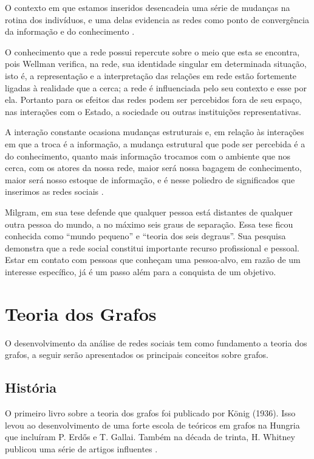 O contexto em que estamos inseridos desencadeia uma série de mudanças na rotina dos indivíduos, e uma delas evidencia as redes como ponto de convergência da informação e do conhecimento \cite{Tomae:Alcara:Chiara:2005}.

O conhecimento que a rede possui repercute sobre o meio que esta se encontra, pois Wellman \cite{Wellman:1996} verifica, na rede, sua identidade singular em determinada situação, isto é, a representação e a interpretação das relações em rede estão fortemente ligadas à realidade que a cerca; a rede é influenciada pelo seu contexto e esse por ela. Portanto para \cite{Marteleto:2001} os efeitos das redes podem ser percebidos fora de seu espaço, nas interações com o Estado, a sociedade ou outras instituições representativas.

A interação constante ocasiona mudanças estruturais e, em relação às interações em que a troca é a informação, a mudança estrutural que pode ser percebida é a do conhecimento, quanto mais informação trocamos com o ambiente que nos cerca, com os atores da nossa rede, maior será nossa bagagem de conhecimento, maior será nosso estoque de informação, e é nesse poliedro de significados que inserimos as redes sociais \cite{Tomae:Alcara:Chiara:2005}.

Milgram, em sua tese \cite{Milgram:1967} defende que qualquer pessoa está distantes de qualquer outra pessoa do mundo, a no máximo seis graus de separação. Essa tese ficou conhecida como ``mundo pequeno'' e ``teoria dos seis degraus''. Sua pesquisa demonstra que a rede social constitui importante recurso profissional e pessoal. Estar em contato com pessoas que conheçam uma pessoa-alvo, em razão de um interesse específico, já é um passo além para a conquista de um objetivo.

\section{Teoria dos Grafos}

O desenvolvimento da análise de redes sociais tem como fundamento a teoria dos grafos, a seguir serão apresentados os principais conceitos sobre grafos.

\subsection{História}

O primeiro livro sobre a teoria dos grafos foi publicado por König (1936). Isso levou ao desenvolvimento de uma forte escola de teóricos em grafos na Hungria que incluíram P. Erdős e T. Gallai. Também na década de trinta, H. Whitney publicou uma série de artigos influentes \cite{Bondy:2007}.

